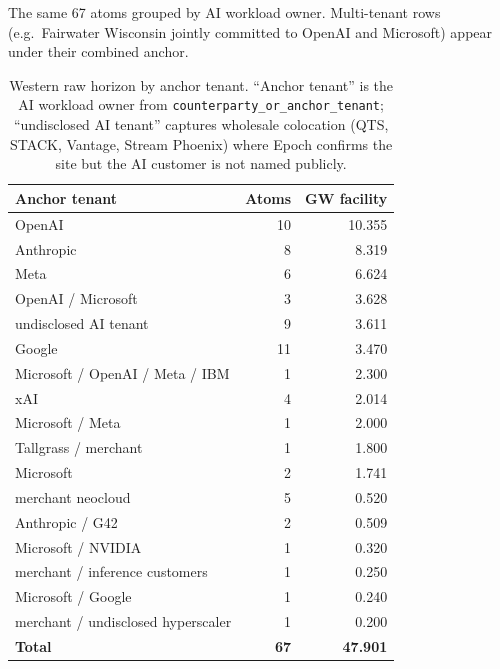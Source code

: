 \documentclass[11pt,a4paper]{article}
\begin{document}
\noindent The same 67 atoms grouped by AI workload owner. Multi-tenant rows (e.g.\ Fairwater Wisconsin jointly committed to OpenAI and Microsoft) appear under their combined anchor.
\begin{table}[H]
\centering\small
\begin{tabular}{@{}lrr@{}}
\toprule
\textbf{Anchor tenant} & \textbf{Atoms} & \textbf{GW facility} \\
\midrule

OpenAI & 10 & 10.355 \\

Anthropic & 8 & 8.319 \\

Meta & 6 & 6.624 \\

OpenAI / Microsoft & 3 & 3.628 \\

undisclosed AI tenant & 9 & 3.611 \\

Google & 11 & 3.470 \\

Microsoft / OpenAI / Meta / IBM & 1 & 2.300 \\

xAI & 4 & 2.014 \\

Microsoft / Meta & 1 & 2.000 \\

Tallgrass / merchant & 1 & 1.800 \\

Microsoft & 2 & 1.741 \\

merchant neocloud & 5 & 0.520 \\

Anthropic / G42 & 2 & 0.509 \\

Microsoft / NVIDIA & 1 & 0.320 \\

merchant / inference customers & 1 & 0.250 \\

Microsoft / Google & 1 & 0.240 \\

merchant / undisclosed hyperscaler & 1 & 0.200 \\

\midrule\textbf{Total} & \textbf{67} & \textbf{47.901} \\

\bottomrule
\end{tabular}
\caption{Western raw horizon by anchor tenant. ``Anchor tenant'' is the AI workload owner from \texttt{counterparty\_or\_anchor\_tenant}; ``undisclosed AI tenant'' captures wholesale colocation (QTS, STACK, Vantage, Stream Phoenix) where Epoch confirms the site but the AI customer is not named publicly.}
\end{table}
\end{document}
